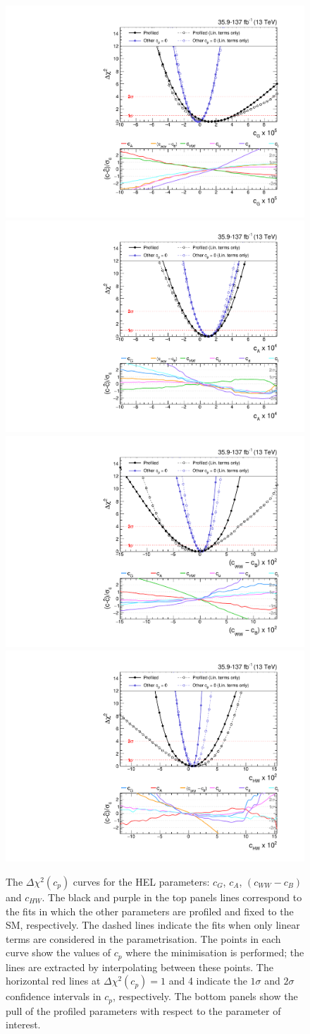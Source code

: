 \begin{figure}[htb!]
  \centering
  \includegraphics[width=.49\textwidth]{Figures/eft/chi2/observed/cG.pdf}
  \includegraphics[width=.49\textwidth]{Figures/eft/chi2/observed/cA.pdf}
  \includegraphics[width=.49\textwidth]{Figures/eft/chi2/observed/cWWMinuscB.pdf}
  \includegraphics[width=.49\textwidth]{Figures/eft/chi2/observed/cHW.pdf}
  \caption[Simplified HEL re-interpretation: $c_G$, $c_A$, $(c_{WW}-c_B)$ and $c_{HW}$]
  {
    The $\Delta\chi^2(c_p)$ curves for the HEL parameters: $c_G$, $c_A$, $(c_{WW}-c_B)$ and $c_{HW}$. The black and purple in the top panels lines correspond to the fits in which the other parameters are profiled and fixed to the SM, respectively. The dashed lines indicate the fits when only linear terms are considered in the parametrisation. The points in each curve show the values of $c_p$ where the minimisation is performed; the lines are extracted by interpolating between these points. The horizontal red lines at $\Delta\chi^2(c_p)=1$ and 4 indicate the $1\sigma$ and $2\sigma$ confidence intervals in $c_p$, respectively. The bottom panels show the pull of the profiled parameters with respect to the parameter of interest. 
  }
  \label{fig:hel_chi2_simplified_0}
\end{figure}

